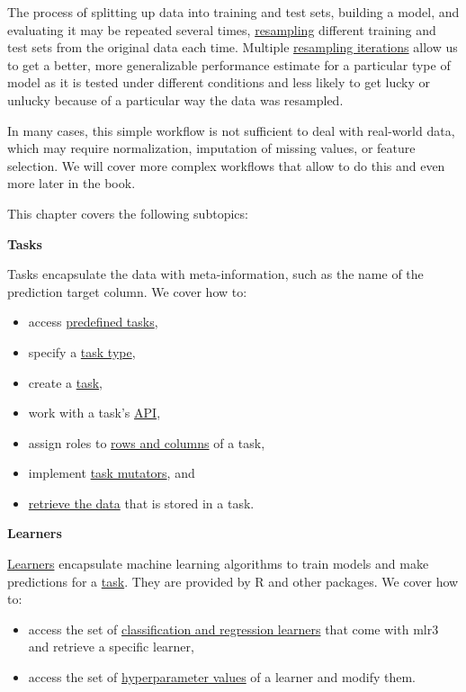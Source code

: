 \documentclass[
]{scrbook}
\providecommand{\tightlist}{%
  \setlength{\itemsep}{0pt}\setlength{\parskip}{0pt}}
\begin{document}
The process of splitting up data into training and test sets, building a model, and evaluating it may be repeated several times, \protect\hyperlink{resampling}{resampling} different training and test sets from the original data each time.
Multiple \protect\hyperlink{resampling}{resampling iterations} allow us to get a better, more generalizable performance estimate for a particular type of model as it is tested under different conditions and less likely to get lucky or unlucky because of a particular way the data was resampled.

In many cases, this simple workflow is not sufficient to deal with real-world data, which may require normalization, imputation of missing values, or feature selection.
We will cover more complex workflows that allow to do this and even more later in the book.

This chapter covers the following subtopics:

\textbf{Tasks}

Tasks encapsulate the data with meta-information, such as the name of the prediction target column.
We cover how to:

\begin{itemize}
\tightlist
\item
  access \protect\hyperlink{tasks-predefined}{predefined tasks},
\item
  specify a \protect\hyperlink{tasks-types}{task type},
\item
  create a \protect\hyperlink{tasks-creation}{task},
\item
  work with a task's \protect\hyperlink{tasks-api}{API},
\item
  assign roles to \protect\hyperlink{tasks-roles}{rows and columns} of a task,
\item
  implement \protect\hyperlink{tasks-mutators}{task mutators}, and
\item
  \protect\hyperlink{tasks-retrieving}{retrieve the data} that is stored in a task.
\end{itemize}

\textbf{Learners}

\protect\hyperlink{learners}{Learners} encapsulate machine learning algorithms to train models and make predictions for a \protect\hyperlink{tasks}{task}.
They are provided by R and other packages.
We cover how to:

\begin{itemize}
\tightlist
\item
  access the set of \protect\hyperlink{predefined-learners}{classification and regression learners} that come with mlr3 and retrieve a specific learner,
\item
  access the set of \protect\hyperlink{predefined-learners}{hyperparameter values} of a learner and modify them.
\end{itemize}
\end{document}
